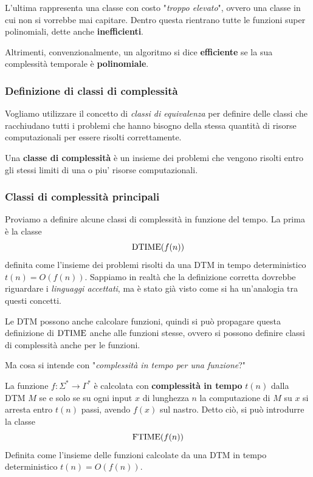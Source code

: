 L'ultima rappresenta una classe con costo "\textit{troppo elevato}", ovvero una classe in cui non si vorrebbe mai capitare. Dentro questa rientrano tutte le funzioni super polinomiali, dette anche \textbf{inefficienti}.

Altrimenti, convenzionalmente, un algoritmo si dice \textbf{efficiente} se la sua complessità temporale è \textbf{polinomiale}.

\subsubsection{Definizione di classi di complessità}

Vogliamo utilizzare il concetto di \textit{classi di equivalenza} per definire delle classi che racchiudano tutti i problemi che hanno bisogno della stessa quantità di risorse computazionali per essere risolti correttamente.

Una \textbf{classe di complessità} è un insieme dei problemi che vengono risolti entro gli stessi limiti di una o piu' risorse computazionali.

\subsubsection{Classi di complessità principali}

Proviamo a definire alcune classi di complessità in funzione del tempo. La prima è la classe
$$ \text{DTIME}(f(n)) $$
definita come l'insieme dei problemi risolti da una DTM in tempo deterministico $t(n) = O(f(n))$. Sappiamo in realtà che la definizione corretta dovrebbe riguardare i \textit{linguaggi accettati}, ma è stato già visto come si ha un'analogia tra questi concetti.

Le DTM possono anche calcolare funzioni, quindi si può propagare questa definizione di $\text{DTIME}$ anche alle funzioni stesse, ovvero si possono definire classi di complessità anche per le funzioni.

Ma cosa si intende con "\textit{complessità in tempo per una funzione}?"

La funzione $f: \Sigma^\ast \rightarrow \Gamma^\ast$ è calcolata con \textbf{complessità in tempo} $t(n)$ dalla DTM $M$ se e solo se su ogni input $x$ di lunghezza $n$ la computazione di $M$ su $x$ si arresta entro $t(n)$ passi, avendo $f(x)$ sul nastro. Detto ciò, si può introdurre la classe
$$ \text{FTIME} (f(n)) $$
Definita come l'insieme delle funzioni calcolate da una DTM in tempo deterministico $t(n) = O(f(n))$.

